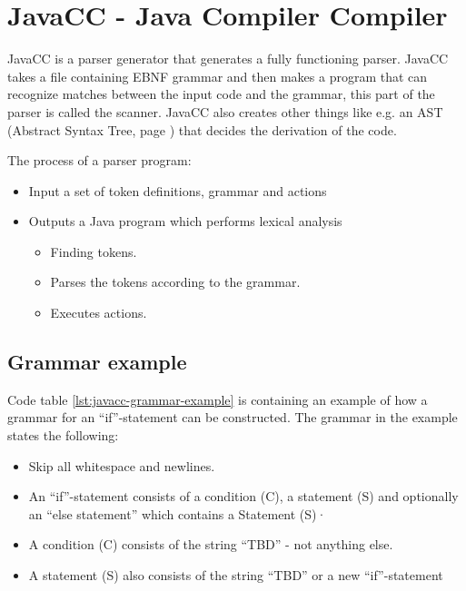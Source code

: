 \chapter{JavaCC - Java Compiler Compiler}
JavaCC is a parser generator that generates a fully functioning parser. JavaCC takes a file containing EBNF grammar and then makes a program that can recognize matches between the input code and the grammar, this part of the parser is called the scanner. JavaCC also creates other things like e.g. an AST (Abstract Syntax Tree, page ) that decides the derivation of the code. \cite{JavaCC}

The process of a parser program:
\begin{itemize}
\item Input a set of token definitions, grammar and actions
\item Outputs a Java program which performs lexical analysis
	\begin{itemize}
	\item Finding tokens.
	\item Parses the tokens according to the grammar.
	\item Executes actions.
	\end{itemize}
\end{itemize}


\section{Grammar example}
Code table \ref{lst:javacc-grammar-example} is containing an example of how a grammar for an ``if''-statement can be constructed. The grammar in the example states the following:

\begin{itemize}
	\item Skip all whitespace and newlines.
	\item An ``if''-statement consists of a condition (C), a statement (S)  and optionally an ``else statement'' which contains a Statement (S)·
	\item A condition (C) consists of the string ``TBD'' - not anything else.
	\item A statement (S) also consists of the string ``TBD'' or a new ``if''-statement
\end{itemize}

